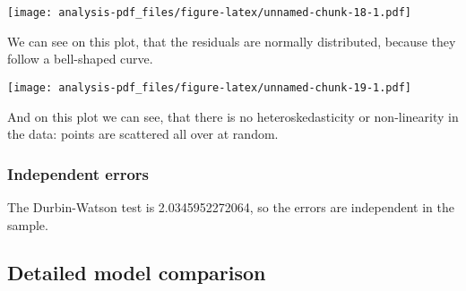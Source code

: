 \documentclass[
]{article}
\begin{document}
\texttt{[image: analysis-pdf\_files/figure-latex/unnamed-chunk-18-1.pdf]}

We can see on this plot, that the residuals are normally distributed,
because they follow a bell-shaped curve.

\texttt{[image: analysis-pdf\_files/figure-latex/unnamed-chunk-19-1.pdf]}

And on this plot we can see, that there is no heteroskedasticity or
non-linearity in the data: points are scattered all over at random.

\hypertarget{independent-errors}{%
\subsubsection{Independent errors}\label{independent-errors}}

The Durbin-Watson test is 2.0345952272064, so the errors are independent
in the sample.

\hypertarget{detailed-model-comparison}{%
\subsection{Detailed model comparison}\label{detailed-model-comparison}}
\end{document}
